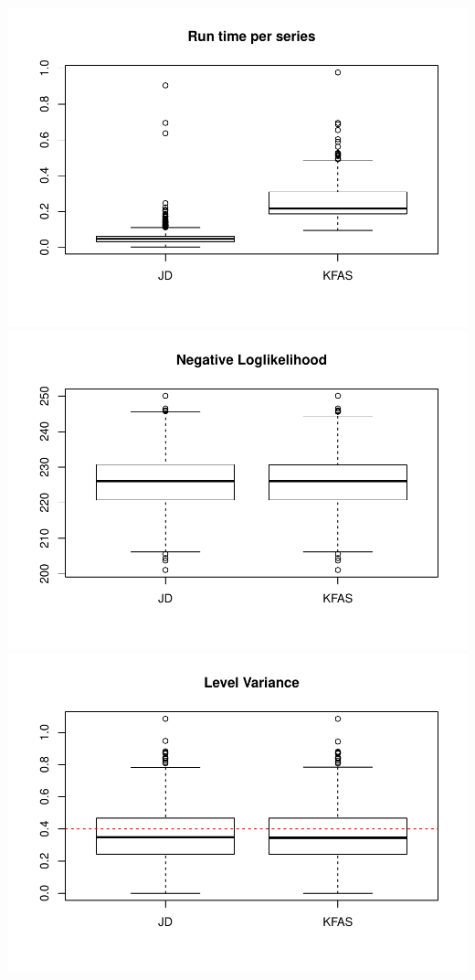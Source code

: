 \documentclass[]{article}
\begin{document}
\includegraphics{simulation_test_files/figure-latex/simulate-2.pdf}
\includegraphics{simulation_test_files/figure-latex/simulate-3.pdf}
\includegraphics{simulation_test_files/figure-latex/simulate-4.pdf}
\end{document}
